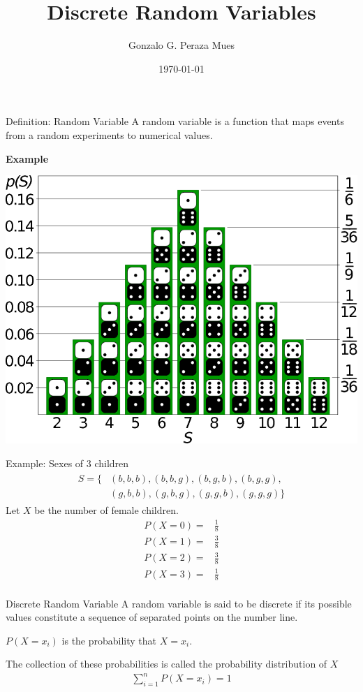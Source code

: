 \documentclass{beamer}
\title{Discrete Random Variables}
\date{\today}
\author{Gonzalo G. Peraza Mues}
\begin{document}
\maketitle

\begin{frame}{Definition: Random Variable}
  A \alert{random variable} is a function that maps events from a random
  experiments to numerical values.

  \begin{center}
    \textbf{Example}

    \includegraphics[width=0.6\linewidth]{dice-dist-bar}
  \end{center}
\end{frame}

\begin{frame}{Example: Sexes of 3 children}
  \begin{align*}
    \begin{split}
      S = \{&(b, b, b), (b, b, g), (b, g, b), (b, g, g),\\
      &(g, b, b), (g, b, g), (g, g, b), (g, g, g)\}
    \end{split}
  \end{align*}
  Let $X$ be the number of female children.
  \begin{align*}
    P(X=0) =& \frac{1}{8}\\
    P(X=1) =& \frac{3}{8}\\
    P(X=2) =& \frac{3}{8}\\
    P(X=3) =& \frac{1}{8}\\
  \end{align*}
\end{frame}

\begin{frame}{Discrete Random Variable}
  A random variable is said to be \alert{discrete} if its possible values
  constitute a sequence of \alert{separated points} on the number line.

  $P(X=x_i)$ is the probability that $X=x_i$.

  The collection of these probabilities is called the \alert{probability
    distribution} of $X$
  \begin{align*}
    \sum_{i=1}^n P(X=x_i) = 1
  \end{align*}
\end{frame}
\end{document}
